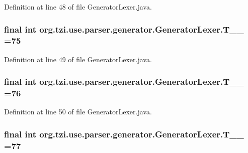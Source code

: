 Definition at line 48 of file Generator\-Lexer.\-java.

\hypertarget{classorg_1_1tzi_1_1use_1_1parser_1_1generator_1_1_generator_lexer_aa41e4a4b54131d397d0682dc18600288}{
\subsubsection[{T\-\_\-\-\_\-75}]{\setlength{\rightskip}{0pt plus 5cm}final int org.\-tzi.\-use.\-parser.\-generator.\-Generator\-Lexer.\-T\-\_\-\-\_ =75\hspace{0.3cm}{\ttfamily [static]}}}\label{classorg_1_1tzi_1_1use_1_1parser_1_1generator_1_1_generator_lexer_aa41e4a4b54131d397d0682dc18600288}


Definition at line 49 of file Generator\-Lexer.\-java.

\hypertarget{classorg_1_1tzi_1_1use_1_1parser_1_1generator_1_1_generator_lexer_aceb2a4f9bff3a9cc758be6e4189483ef}{
\subsubsection[{T\-\_\-\-\_\-76}]{\setlength{\rightskip}{0pt plus 5cm}final int org.\-tzi.\-use.\-parser.\-generator.\-Generator\-Lexer.\-T\-\_\-\-\_ =76\hspace{0.3cm}{\ttfamily [static]}}}\label{classorg_1_1tzi_1_1use_1_1parser_1_1generator_1_1_generator_lexer_aceb2a4f9bff3a9cc758be6e4189483ef}


Definition at line 50 of file Generator\-Lexer.\-java.

\hypertarget{classorg_1_1tzi_1_1use_1_1parser_1_1generator_1_1_generator_lexer_a037a7e409370d3cbf504b20a61f3e9d1}{
\subsubsection[{T\-\_\-\-\_\-77}]{\setlength{\rightskip}{0pt plus 5cm}final int org.\-tzi.\-use.\-parser.\-generator.\-Generator\-Lexer.\-T\-\_\-\-\_ =77\hspace{0.3cm}{\ttfamily [static]}}}\label{classorg_1_1tzi_1_1use_1_1parser_1_1generator_1_1_generator_lexer_a037a7e409370d3cbf504b20a61f3e9d1}


